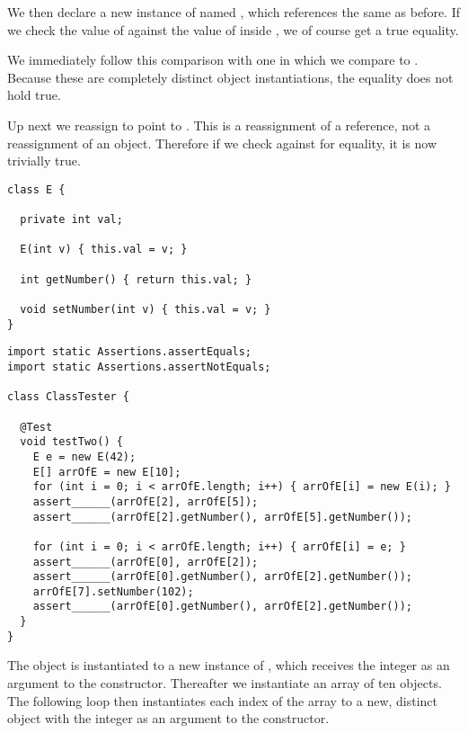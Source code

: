 We then declare a new instance of  named , which references the same  as before. If we check the value of  against the value of  inside , we of course get a true equality.

We immediately follow this comparison with one in which we compare  to . Because these are completely distinct object instantiations, the equality does not hold true.

Up next we reassign  to point to . This is a reassignment of a reference, not a reassignment of an object. Therefore if we check  against  for equality, it is now trivially true.


\begin{lstlisting}[language=MyJava]
class E {

  private int val;

  E(int v) { this.val = v; }

  int getNumber() { return this.val; }

  void setNumber(int v) { this.val = v; }
}
\end{lstlisting}

\begin{lstlisting}[language=MyJava]
import static Assertions.assertEquals;
import static Assertions.assertNotEquals;

class ClassTester {

  @Test
  void testTwo() {
    E e = new E(42);
    E[] arrOfE = new E[10];
    for (int i = 0; i < arrOfE.length; i++) { arrOfE[i] = new E(i); }
    assert______(arrOfE[2], arrOfE[5]);
    assert______(arrOfE[2].getNumber(), arrOfE[5].getNumber());

    for (int i = 0; i < arrOfE.length; i++) { arrOfE[i] = e; }
    assert______(arrOfE[0], arrOfE[2]);
    assert______(arrOfE[0].getNumber(), arrOfE[2].getNumber());
    arrOfE[7].setNumber(102);
    assert______(arrOfE[0].getNumber(), arrOfE[2].getNumber());
  }
}
\end{lstlisting}

The object  is instantiated to a new instance of , which receives the integer  as an argument to the constructor. Thereafter we instantiate an array of ten  objects. The following loop then instantiates each index of the array to a new, distinct  object with the integer  as an argument to the constructor.

